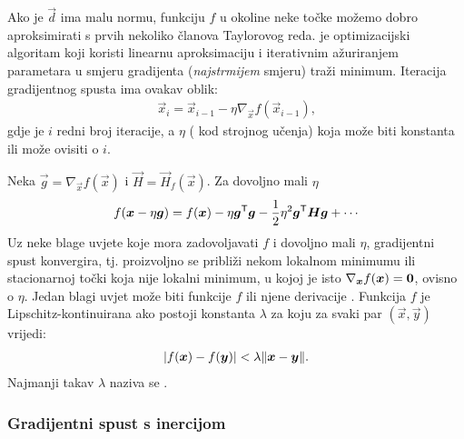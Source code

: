 \documentclass[utf8, diplomski, lmodern]{fer}
\begin{document}
Ako je $\vec d$ ima malu normu, funkciju $f$ u okoline neke točke možemo dobro aproksimirati s prvih nekoliko članova Taylorovog reda.  je optimizacijski algoritam koji koristi linearnu aproksimaciju i iterativnim ažuriranjem parametara u smjeru gradijenta (\textit{najstrmijem} smjeru) traži minimum. Iteracija gradijentnog spusta ima ovakav oblik:
\begin{align} \label{eq:gs}
\vec x_i = \vec x_{i-1} - \eta\nabla_{\vec x}f(\vec x_{i-1}) \text{,}
\end{align}
gdje je $i$ redni broj iteracije, a $\eta$  ( kod strojnog učenja) koja može biti konstanta ili može ovisiti o $i$.

Neka $\vec g=\nabla_{\vec x}f(\vec x)$ i $\vec H=\vec H_f(\vec x)$. Za dovoljno mali $\eta$
\begin{align} \label{eq:grad-delta-approx}
f(\vec x-\eta\vec g) = f(\vec x) - \eta\vec g^\tp\vec g - \frac{1}{2}\eta^2\vec g^\tp\vec H\vec g + \cdots
\end{align}
Uz neke blage uvjete koje mora zadovoljavati $f$ i dovoljno mali $\eta$, gradijentni spust konvergira, tj. proizvoljno se približi nekom lokalnom minimumu ili stacionarnoj točki koja nije lokalni minimum, u kojoj je isto $\nabla_{\vec x}f(\vec x)=\cvec 0$, ovisno o $\eta$. Jedan blagi uvjet može biti  funkcije $f$ ili njene derivacije \citep{Goodfellow:2016:DL}. Funkcija $f$ je Lipschitz-kontinuirana ako postoji konstanta $\lambda$ za koju za svaki par $(\vec x,\vec y)$ vrijedi:
\begin{align}
\envert{f(\vec x)-f(\vec y)} < \lambda\enVert{\vec x-\vec y} \text{.}
\end{align}
Najmanji takav $\lambda$ naziva se .

\subsubsection{Gradijentni spust s inercijom}
\end{document}
